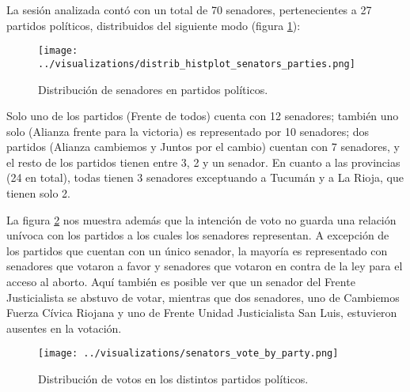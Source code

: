 La sesión analizada contó con un total de 70 senadores,
pertenecientes a 27 partidos políticos, distribuidos del
siguiente modo (figura \ref{fig-distrib-senators}):

\begin{figure}[h!]
\centering
\texttt{[image: ../visualizations/distrib\_histplot\_senators\_parties.png]}
\caption{Distribución de senadores en partidos políticos.}
\label{fig-distrib-senators}
\end{figure}

Solo uno de los partidos (Frente de todos) cuenta con 12
senadores; también uno solo (Alianza frente para la victoria) es
representado por 10 senadores; dos partidos (Alianza cambiemos y
Juntos por el cambio) cuentan con 7 senadores, y el resto de los
partidos tienen entre 3, 2 y un senador.
En cuanto a las provincias (24 en total), todas tienen 3 senadores
exceptuando a Tucumán y a La Rioja, que tienen solo 2.

La figura \ref{fig-distrib-vote} nos muestra además que la intención
de voto no guarda una relación unívoca con los partidos a los cuales los
senadores representan. A excepción de los partidos que cuentan con un único
senador, la mayoría es representado con senadores que votaron a favor y senadores
que votaron en contra de la ley para el acceso al aborto. Aquí también
es posible ver que un senador del Frente Justicialista se abstuvo de votar,
mientras que dos senadores, uno de Cambiemos Fuerza Cívica Riojana y uno de
Frente Unidad Justicialista San Luis, estuvieron ausentes en la votación.

\begin{figure}[h!]
\centering
\texttt{[image: ../visualizations/senators\_vote\_by\_party.png]}
\caption{Distribución de votos en los distintos partidos políticos.}
\label{fig-distrib-vote}
\end{figure}

